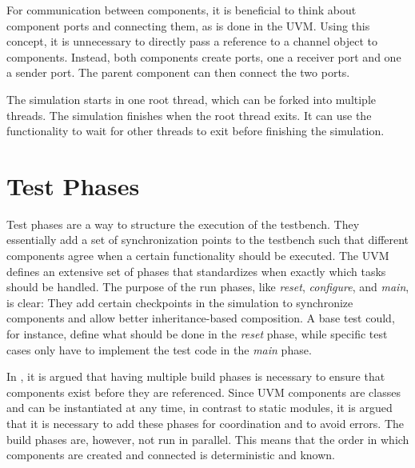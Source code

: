 For communication between components, it is beneficial to think about component ports and connecting
them, as is done in the UVM. Using this concept, it is unnecessary to directly pass a reference to a channel object to
components. Instead, both components create ports, one a receiver port and
one a sender port. The parent component can then connect the two ports.

The simulation starts in one root thread, which can be forked into multiple threads. The simulation finishes when the
root thread exits. It can use the  functionality to wait for other threads to exit before finishing the simulation.

\section{Test Phases} %

Test phases are a way to structure the execution of the testbench. They essentially add a set of synchronization points
to the testbench such that different components agree when a certain functionality should be executed. The UVM
defines an extensive set of phases that standardizes when exactly which tasks should be handled. The purpose of the run
phases, like \textit{reset}, \textit{configure}, and \textit{main}, is clear: They add certain checkpoints in the
simulation to synchronize components and allow better inheritance-based composition. A base test could, for instance,
define what should be done in the \textit{reset} phase, while specific test cases only have to implement the test
code in the \textit{main} phase.

In \cite{uvm_phases}, it is argued that having multiple build phases is necessary to ensure that components exist
before they are referenced. Since UVM components are classes and can be instantiated at any time, in contrast to
static modules, it is argued that it is necessary to add these phases for coordination and to avoid errors. The build phases are, however, not run in parallel. This means that the order in which components are created and connected is deterministic and known.

